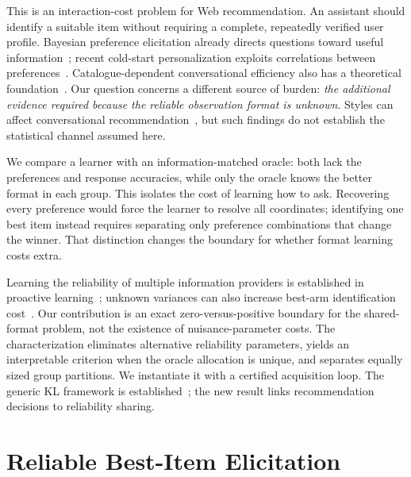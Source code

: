 \documentclass[sigconf,anonymous,review]{acmart}
\begin{document}
This is an interaction-cost problem for Web recommendation. An assistant should identify a suitable item without requiring a complete, repeatedly verified user profile. Bayesian preference elicitation already directs questions toward useful information~\cite{guo2010}; recent cold-start personalization exploits correlations between preferences~\cite{bose2026}. Catalogue-dependent conversational efficiency also has a theoretical foundation~\cite{dinoia2022}. Our question concerns a different source of burden: \emph{the additional evidence required because the reliable observation format is unknown}. Styles can affect conversational recommendation~\cite{kostric2025}, but such findings do not establish the statistical channel assumed here.

We compare a learner with an information-matched oracle: both lack the preferences and response accuracies, while only the oracle knows the better format in each group. This isolates the cost of learning how to ask. Recovering every preference would force the learner to resolve all coordinates; identifying one best item instead requires separating only preference combinations that change the winner. That distinction changes the boundary for whether format learning costs extra.

Learning the reliability of multiple information providers is established in proactive learning~\cite{yang2009}; unknown variances can also increase best-arm identification cost~\cite{jourdan2023}. Our contribution is an exact zero-versus-positive boundary for the shared-format problem, not the existence of nuisance-parameter costs. The characterization eliminates alternative reliability parameters, yields an interpretable criterion when the oracle allocation is unique, and separates equally sized group partitions. We instantiate it with a certified acquisition loop. The generic KL framework is established~\cite{garivier2016,degenne2019,deshmukh2019}; the new result links recommendation decisions to reliability sharing.

\section{Reliable Best-Item Elicitation}
\end{document}
